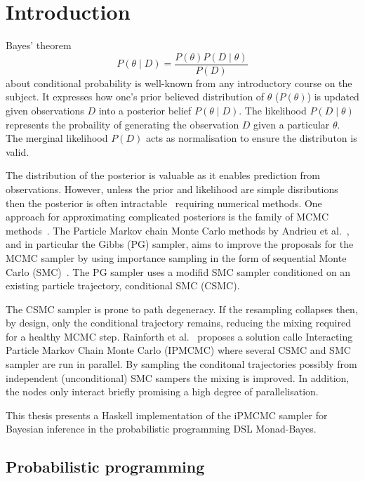 \section{Introduction}

Bayes' theorem
\begin{equation}
    P(\theta\mid D) = \frac {P(\theta) P(D \mid \theta)}{P(D)}
\end{equation}
about conditional probability is well-known from any introductory course on the subject. It expresses how one's prior believed distribution of $\theta$ ($P(\theta)$) is updated given observations $D$ into a posterior belief $P(\theta\mid D)$. The likelihood $P(D \mid \theta)$ represents the probaility of generating the observation $D$ given a particular $\theta$. The merginal likelihood $P(D)$ acts as normalisation to ensure the distributon is valid.

The distribution of the posterior is valuable as it enables prediction from observations. However, unless the prior and likelihood are simple disributions then the posterior is often intractable~\cite{barber} requiring numerical methods. One approach for approximating complicated posteriors is the family of MCMC  methods~\cite{robert}. The Particle Markov chain Monte Carlo methods by Andrieu et al.~\cite{pmcmc}, and in particular the Gibbs (PG) sampler, aims to improve the proposals for the MCMC sampler by using importance sampling in the form of sequential Monte Carlo (SMC)~\cite{smc}. The PG sampler uses a modifid SMC sampler conditioned on an existing particle trajectory, conditional SMC (CSMC).

The CSMC sampler is prone to path degeneracy. If the resampling collapses then, by design, only the conditional trajectory remains, reducing the mixing required for a healthy MCMC step. Rainforth et al.~\cite{ipmcmc} proposes a solution calle Interacting Particle Markov Chain Monte Carlo (IPMCMC) where several CSMC and SMC sampler are run in parallel. By sampling the conditonal trajectories possibly from independent (unconditional) SMC sampers the mixing is improved. In addition, the nodes only interact briefly promising a high degree of parallelisation.

This thesis presents a Haskell implementation of the iPMCMC sampler for Bayesian inference in the probabilistic programming DSL Monad-Bayes.

\subsection{Probabilistic programming}
\label{sec:pprog}

